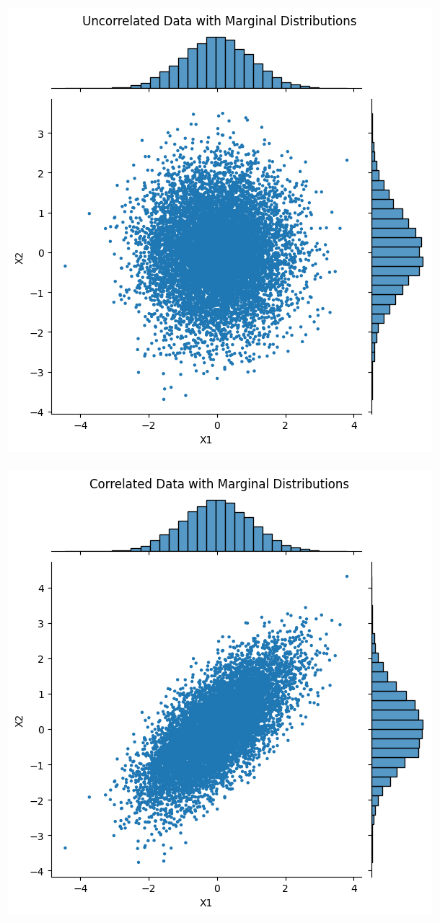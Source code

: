 \begin{figure}
    \centering
    \begin{minipage}{0.4\textwidth}
        \centering
        \includegraphics[width=\textwidth]{3Theory/pictures/UncorrelatedScatter.png}
        \label{fig:UncorrelatedScatter}
    \end{minipage}
    \hfill
    \begin{minipage}{0.4\textwidth}
        \centering
        \includegraphics[width=\textwidth]{3Theory/pictures/CorrelatedScatter.png}

\end{minipage}
\end{figure}
